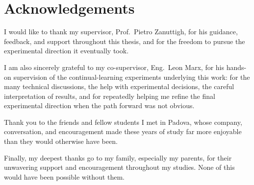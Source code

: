 \chapter*{Acknowledgements}

I would like to thank my supervisor, Prof.\ Pietro Zanuttigh, for his
guidance, feedback, and support throughout this thesis, and for the
freedom to pursue the experimental direction it eventually took.

I am also sincerely grateful to my co-supervisor, Eng.\ Leon Marx, for his
hands-on supervision of the
continual-learning experiments underlying this work: for the many
technical discussions, the help with experimental decisions, the careful
interpretation of results, and for repeatedly helping me refine the final
experimental direction when the path forward was not obvious.

Thank you to the friends and fellow students I met in Padova, whose
company, conversation, and encouragement made these years of study far
more enjoyable than they would otherwise have been.

Finally, my deepest thanks go to my family, especially my parents, for
their unwavering support and encouragement throughout my studies. None of
this would have been possible without them.
